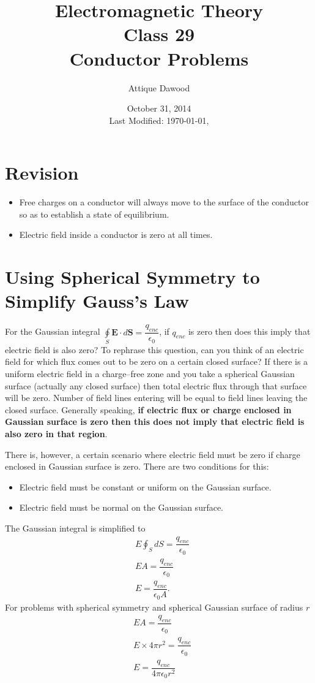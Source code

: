 \documentclass[12pt,a4paper]{article}
\title{Electromagnetic Theory\\Class 29\\Conductor Problems}
\author{Attique Dawood}
\date{October 31, 2014\\[0.2cm] Last Modified: \today, \currenttime}
\begin{document}
\maketitle
\section{Revision}
\begin{itemize}
\item Free charges on a conductor will always move to the surface of the conductor so as to establish a state of equilibrium.
\item Electric field inside a conductor is zero at all times.
\end{itemize}
\section{Using Spherical Symmetry to Simplify Gauss's Law}
For the Gaussian integral $\oint\limits_{S} \textbf{E}\cdot d\textbf{S}=\dfrac{q_{enc}}{\epsilon_0}$, if $q_{enc}$ is zero then does this imply that electric field is also zero? To rephrase this question, can you think of an electric field for which flux comes out to be zero on a certain closed surface? If there is a uniform electric field in a charge--free zone and you take a spherical Gaussian surface (actually any closed surface) then total electric flux through that surface will be zero. Number of field lines entering will be equal to field lines leaving the closed surface. Generally speaking, \textbf{if electric flux or charge enclosed in Gaussian surface is zero then this does not imply that electric field is also zero in that region}.

There is, however, a certain scenario where electric field must be zero if charge enclosed in Gaussian surface is zero. There are two conditions for this:
\begin{itemize}
\item Electric field must be constant or uniform on the Gaussian surface.
\item Electric field must be normal on the Gaussian surface.
\end{itemize}
The Gaussian integral is simplified to
\begin{equation}
\begin{split}
&E\oint_{S}dS=\dfrac{q_{enc}}{\epsilon_0}\\
&EA=\dfrac{q_{enc}}{\epsilon_0}\\
&E=\dfrac{q_{enc}}{\epsilon_0A}.
\end{split}
\end{equation}
For problems with spherical symmetry and spherical Gaussian surface of radius $r$
\begin{equation}
\begin{split}
&EA=\dfrac{q_{enc}}{\epsilon_0}\\
&E\times 4\pi r^2=\dfrac{q_{enc}}{\epsilon_0}\\
&E=\dfrac{q_{enc}}{ 4\pi\epsilon_0 r^2}
\end{split}
\end{equation}
\end{document}

